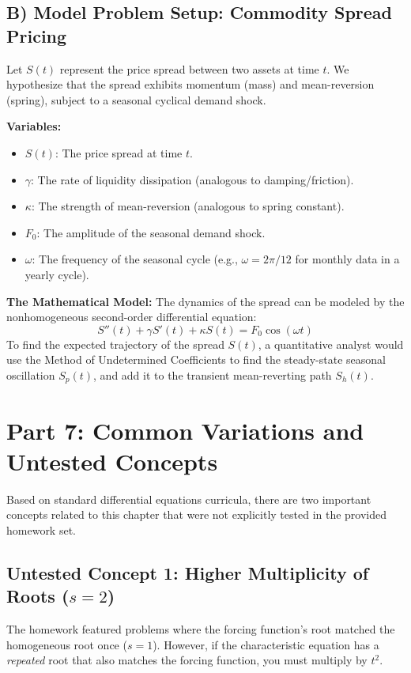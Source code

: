 \documentclass[12pt]{article}
\begin{document}
\subsection{B) Model Problem Setup: Commodity Spread Pricing}
Let $S(t)$ represent the price spread between two assets at time $t$. We hypothesize that the spread exhibits momentum (mass) and mean-reversion (spring), subject to a seasonal cyclical demand shock.

\textbf{Variables:}
\begin{itemize}
    \item $S(t)$: The price spread at time $t$.
    \item $\gamma$: The rate of liquidity dissipation (analogous to damping/friction).
    \item $\kappa$: The strength of mean-reversion (analogous to spring constant).
    \item $F_0$: The amplitude of the seasonal demand shock.
    \item $\omega$: The frequency of the seasonal cycle (e.g., $\omega = 2\pi/12$ for monthly data in a yearly cycle).
\end{itemize}

\textbf{The Mathematical Model:}
The dynamics of the spread can be modeled by the nonhomogeneous second-order differential equation:
\[ S''(t) + \gamma S'(t) + \kappa S(t) = F_0 \cos(\omega t) \]
To find the expected trajectory of the spread $S(t)$, a quantitative analyst would use the Method of Undetermined Coefficients to find the steady-state seasonal oscillation $S_p(t)$, and add it to the transient mean-reverting path $S_h(t)$.

\newpage
\section{Part 7: Common Variations and Untested Concepts}

Based on standard differential equations curricula, there are two important concepts related to this chapter that were not explicitly tested in the provided homework set.

\subsection{Untested Concept 1: Higher Multiplicity of Roots ($s=2$)}
The homework featured problems where the forcing function's root matched the homogeneous root once ($s=1$). However, if the characteristic equation has a \textit{repeated} root that also matches the forcing function, you must multiply by $t^2$.
\end{document}
